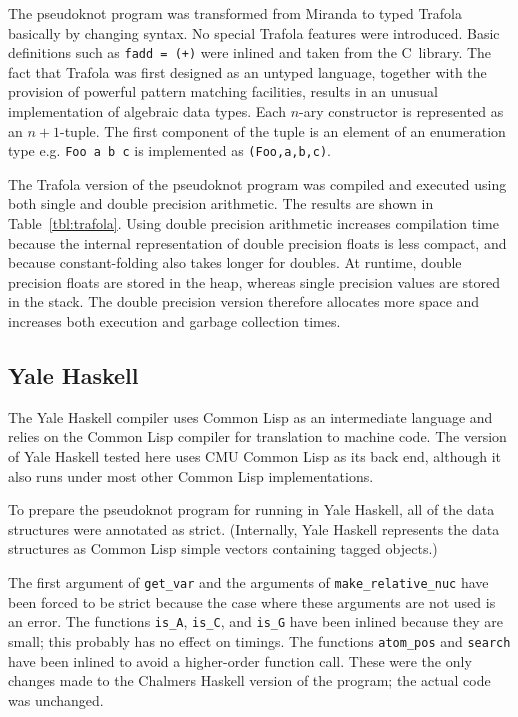 The pseudoknot program was transformed from Miranda to typed Trafola
basically by changing syntax.  No special Trafola features were
introduced. Basic definitions such as
\verb|fadd = (+)| were inlined and taken from the C~library. The fact
that Trafola was first designed as an untyped language, together with
the provision of powerful pattern matching facilities, results in an
unusual implementation of algebraic data types. Each $n$-ary
constructor is represented as an $n+1$-tuple. The first component of
the tuple is an element of an enumeration type e.g. \verb=Foo a b c= is
implemented as \verb=(Foo,a,b,c)=.

The Trafola version of the pseudoknot program was compiled and
executed using both single and double precision arithmetic. The
results are shown in Table~\ref{tbl:trafola}. Using double precision
arithmetic increases compilation time because the internal
representation of double precision floats is less compact, and because
constant-folding also takes longer for doubles.
At runtime, double precision floats are stored in the heap, whereas
single precision values are stored in the stack. The double
precision version therefore allocates more space and increases both
execution and garbage collection times.

\subsection{Yale Haskell}
The Yale Haskell compiler uses Common Lisp as an intermediate language
and relies on the Common Lisp compiler for translation to machine
code. The version of Yale Haskell tested here uses CMU Common Lisp as
its back end, although it also runs under most other Common Lisp
implementations.

To prepare the pseudoknot program for running in Yale Haskell, all of
the data structures were annotated as strict. (Internally, Yale
Haskell represents the data structures as Common Lisp simple vectors
containing tagged objects.)

The first argument of \verb=get_var= and the arguments of
\verb=make_relative_nuc= have been forced to be strict because the case
where these arguments are not used is an error. The functions
\verb=is_A=, \verb=is_C=, and \verb=is_G= have been inlined because
they are small; this probably has no effect on timings. The functions
\verb=atom_pos= and \verb=search= have been inlined to avoid a
higher-order function call. These were the only changes made to the
Chalmers Haskell version of the program; the actual code was unchanged.

